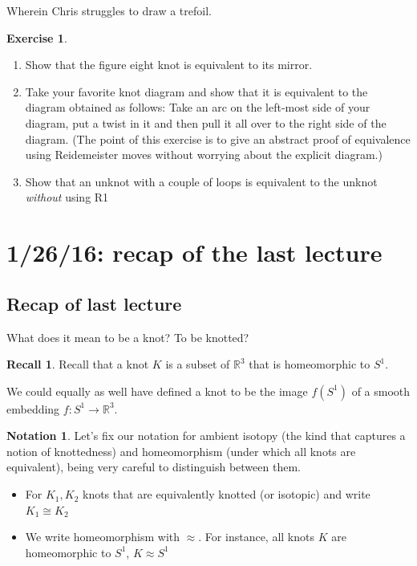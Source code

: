 \documentclass[11pt]{article}
\newcommand{\R}{\mathbb{R}}
\theoremstyle{plain}
\theoremstyle{definition}
\newtheorem{recall}{Recall}
\newtheorem{exercise}{Exercise}
\newtheorem{notation}{Notation}
\begin{document}
Wherein Chris struggles to draw a trefoil.

\begin{exercise}
  \begin{enumerate}
    \item Show that the figure eight knot is equivalent to its mirror.
    \item Take your favorite knot diagram and show that it is equivalent to the diagram obtained as follows: Take an arc on the left-most side of your diagram, put a twist in it and then pull it all over to the right side of the diagram. (The point of this exercise is to give an abstract proof of equivalence using Reidemeister moves without worrying about the explicit diagram.)
    \item Show that an unknot with a couple of loops is equivalent to the unknot \emph{without} using R1
  \end{enumerate}
\end{exercise}


\clearpage
\section{1/26/16: recap of the last lecture}

\subsection{Recap of last lecture}

What does it mean to be a knot? To be knotted?


\begin{recall}
  Recall that a knot $K$ is a subset of $\R^3$ that is homeomorphic to $S^1$.

  We could equally as well have defined a knot to be the image $f(S^1)$ of a smooth embedding $f: S^1 \to \R^3$.
\end{recall}


\begin{notation}
  Let's fix our notation for ambient isotopy (the kind that captures a notion of knottedness) and homeomorphism (under which all knots are equivalent), being very careful to distinguish between them.
  \begin{itemize}
  \item For $K_1, K_2$ knots that are equivalently knotted (or isotopic) and write $K_1 \cong K_2$
  \item We write homeomorphism with $\approx$. For instance, all knots $K$ are homeomorphic to $S^1$, $K \approx S^1$
  \end{itemize}
\end{notation}
\end{document}
